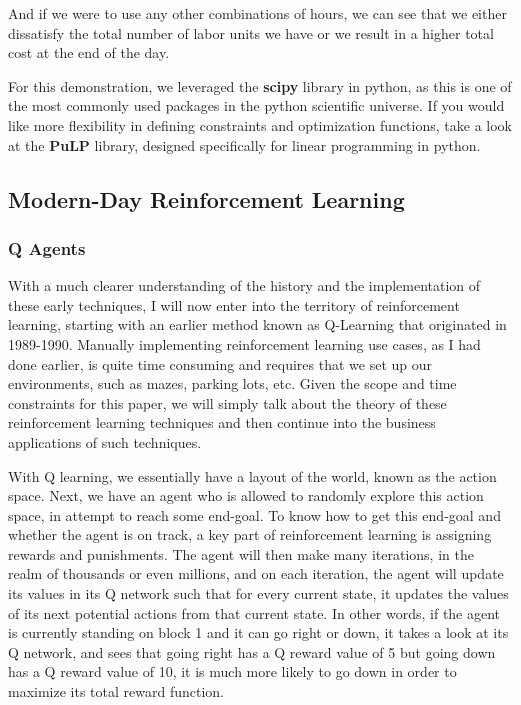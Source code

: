 \documentclass[a4paper,10pt]{extarticle}
\begin{document}
\begin{multicols}{2}
                        And if we were to use any other combinations of hours, we can see that we either dissatisfy the total number of labor units we have or we result in a higher total cost at the end of the day.

                        For this demonstration, we leveraged the \textbf{scipy} library in python, as this is one of the most commonly used packages in the python scientific universe. If you would like more flexibility in defining constraints and optimization functions, take a look at the \textbf{PuLP} library, designed specifically for linear programming in python.

                        \smallskip


                        \subsection{Modern-Day Reinforcement Learning}

                        \subsubsection{Q Agents}
                        With a much clearer understanding of the history and the implementation of these early techniques, I will now enter into the territory of reinforcement learning, starting with an earlier method known as Q-Learning that originated in 1989-1990. Manually implementing reinforcement learning use cases, as I had done earlier, is quite time consuming and requires that we set up our environments, such as mazes, parking lots, etc. Given the scope and time constraints for this paper, we will simply talk about the theory of these reinforcement learning techniques and then continue into the business applications of such techniques.

                        With Q learning, we essentially have a layout of the world, known as the action space. Next, we have an agent who is allowed to randomly explore this action space, in attempt to reach some end-goal. To know how to get this end-goal and whether the agent is on track, a key part of reinforcement learning is assigning rewards and punishments. The agent will then make many iterations, in the realm of thousands or even millions, and on each iteration, the agent will update its values in its Q network such that for every current state, it updates the values of its next potential actions from that current state. In other words, if the agent is currently standing on block 1 and it can go right or down, it takes a look at its Q network, and sees that going right has a Q reward value of 5 but going down has a Q reward value of 10, it is much more likely to go down in order to maximize its total reward function. 


\end{multicols}
\end{document}
